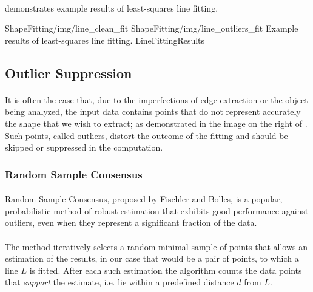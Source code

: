 \paragraph*{}
 demonstrates example results of least-squares line fitting.

\twoFigures
{ShapeFitting/img/line_clean_fit}
{ShapeFitting/img/line_outliers_fit}
{Example results of least-squares line fitting.}
{LineFittingResults}
{\basicWidth}

\subsection{Outlier Suppression}

\paragraph*{}
It is often the case that, due to the imperfections of edge extraction or the object being analyzed, the input data contains points that do not represent accurately the shape that we wish to extract; as demonstrated in the image on the right of . Such points, called outliers, distort the outcome of the fitting and should be skipped or suppressed in the computation.

\subsubsection{Random Sample Consensus}

\paragraph*{}
Random Sample Consensus, proposed\cite{FischlerBolles81} by Fischler and Bolles, is a popular, probabilistic method of robust estimation that exhibits good performance against outliers, even when they represent a significant fraction of the data.

\paragraph*{}
The method iteratively selects a random minimal sample of points that allows an estimation of the results, in our case that would be a pair of points, to which a line $L$ is fitted. After each such estimation the algorithm counts the data points that \textit{support} the estimate, i.e. lie within a predefined distance $d$ from $L$. 

